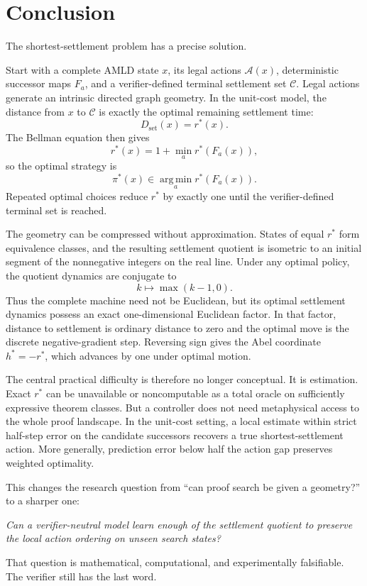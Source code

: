 \documentclass[11pt,letterpaper]{article}
\theoremstyle{remark}
\newcommand{\Cset}{\mathcal C}
\newcommand{\A}{\mathcal A}
\newcommand{\rstar}{r^{\!*}}
\newcommand{\dset}{D_{\mathrm{set}}}
\newcommand{\argmin}{\operatorname*{arg\,min}}
\begin{document}
\section{Conclusion}

The shortest-settlement problem has a precise solution.

Start with a complete AMLD state $x$, its legal actions $\A(x)$, deterministic successor maps $F_a$, and a verifier-defined terminal settlement set $\Cset$. Legal actions generate an intrinsic directed graph geometry. In the unit-cost model, the distance from $x$ to $\Cset$ is exactly the optimal remaining settlement time:
\[
\dset(x)=\rstar(x).
\]
The Bellman equation then gives
\[
\rstar(x)=1+\min_a\rstar(F_a(x)),
\]
so the optimal strategy is
\[
\boxed{\pi^*(x)\in\argmin_a\rstar(F_a(x)).}
\]
Repeated optimal choices reduce $\rstar$ by exactly one until the verifier-defined terminal set is reached.

The geometry can be compressed without approximation. States of equal $\rstar$ form equivalence classes, and the resulting settlement quotient is isometric to an initial segment of the nonnegative integers on the real line. Under any optimal policy, the quotient dynamics are conjugate to
\[
k\longmapsto\max(k-1,0).
\]
Thus the complete machine need not be Euclidean, but its optimal settlement dynamics possess an exact one-dimensional Euclidean factor. In that factor, distance to settlement is ordinary distance to zero and the optimal move is the discrete negative-gradient step. Reversing sign gives the Abel coordinate $h^*=-\rstar$, which advances by one under optimal motion.

The central practical difficulty is therefore no longer conceptual. It is estimation. Exact $\rstar$ can be unavailable or noncomputable as a total oracle on sufficiently expressive theorem classes. But a controller does not need metaphysical access to the whole proof landscape. In the unit-cost setting, a local estimate within strict half-step error on the candidate successors recovers a true shortest-settlement action. More generally, prediction error below half the action gap preserves weighted optimality.

This changes the research question from ``can proof search be given a geometry?'' to a sharper one:
\begin{center}
\emph{Can a verifier-neutral model learn enough of the settlement quotient to preserve the local action ordering on unseen search states?}
\end{center}
That question is mathematical, computational, and experimentally falsifiable. The verifier still has the last word.
\end{document}
